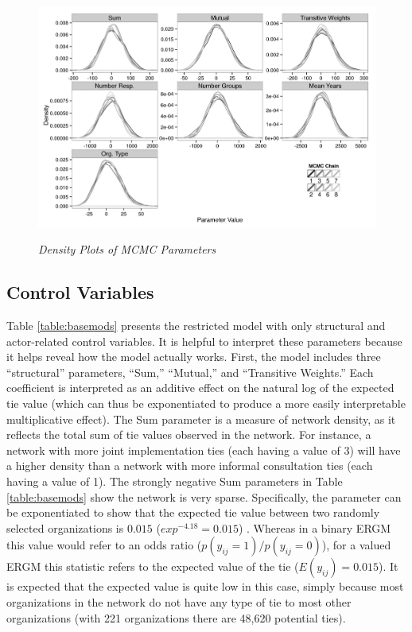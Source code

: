 \documentclass[12pt,a4paper,titlepage]{article}
\begin{document}
\begin{figure}[!ht]
\caption{\textit{Density Plots of MCMC Parameters}}
\graphicspath{ {`/Users/TScott/Google\space Drive/elwha/NetworkChapter'}}
\noindent
\includegraphics[width=6.5in]
{densityplotdu}
\label{figure:densityplots}
\end{figure}

\subsection{Control Variables}

Table \ref{table:basemods} presents the restricted model with only structural and actor-related control variables. It is helpful to interpret these parameters because it helps reveal how the model actually works. First, the model includes three “structural” parameters, “Sum,” “Mutual,” and “Transitive Weights.”  Each coefficient is interpreted as an additive effect on the natural log of the expected tie value (which can thus be exponentiated to produce a more easily interpretable multiplicative effect). The Sum parameter is a measure of network density, as it reflects the total sum of tie values observed in the network. For instance, a network with more joint implementation ties (each having a value of 3) will have a higher density than a network with more informal consultation ties (each having a value of 1). The strongly negative Sum parameters in Table \ref{table:basemods} show the network is very sparse. Specifically, the parameter can be exponentiated to show that the expected tie value between two randomly selected organizations is $0.015$ ($exp^{-4.18} = 0.015$) \parencite{krivitsky2012}. Whereas in a binary ERGM this value would refer to an odds ratio ($p(y_{ij}=1) / p(y_{ij}=0)$), for a valued ERGM this statistic refers to the expected value of the tie ($E(y_{ij})=0.015$). It is expected that the expected value is quite low in this case, simply because most organizations in the network do not have any type of tie to most other organizations (with 221 organizations there are 48,620 potential ties).
\end{document}
